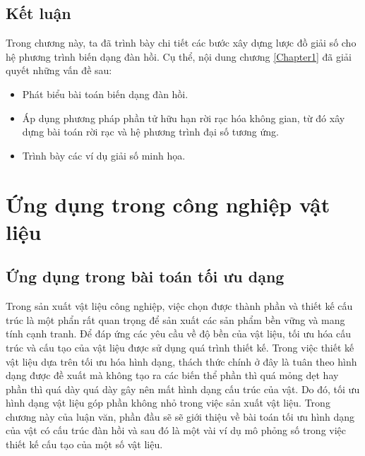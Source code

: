 \documentclass[
12pt, %
oneside, %
english, %
onehalfspacing, %
nolistspacing, %
headsepline, %
addchap,
]{MastersDoctoralThesis} %
\renewcommand{\baselinestretch}{1.5}
\begin{document}
\section{Kết luận}
Trong chương này, ta đã trình bày chi tiết các bước xây dựng lược đồ giải số cho hệ phương trình biến dạng đàn hồi. Cụ thể, nội dung chương \ref{Chapter1} đã giải quyết những vấn đề sau:
\begin{itemize}
\item Phát biểu bài toán biến dạng đàn hồi.
\item Áp dụng phương pháp phần tử hữu hạn rời rạc hóa không gian, từ đó xây dựng bài toán rời rạc và hệ phương trình đại số tương ứng.
\item Trình bày các ví dụ giải số minh họa.
\end{itemize}

\chapter{Ứng dụng trong công nghiệp vật liệu}\label{Chapter2}
\renewcommand{\baselinestretch}{1.25}
\minitoc
\renewcommand{\baselinestretch}{1.5}
\section{Ứng dụng trong bài toán tối ưu dạng}
Trong sản xuất vật liệu công nghiệp, việc chọn được thành phần và thiết kế cấu trúc là một phẩn rất quan trọng để sản xuất các sản phẩm bền vững và mang tính cạnh tranh. Để đáp ứng các yêu cầu về độ bền của vật liệu, tối ưu hóa cấu trúc và cấu tạo của vật liệu được sử dụng quá trình thiết kế. Trong việc thiết kế vật liệu dựa trên tối ưu hóa hình dạng, thách thức chính ở đây là tuân theo hình dạng được đề xuất mà không tạo ra các biến thể phần thì quá mỏng dẹt hay phần thì quá dày quá dày gây nên mất hình dạng cấu trúc của vật. Do đó, tối ưu hình dạng vật liệu góp phần không nhỏ trong việc sản xuất vật liệu. Trong chương này của luận văn, phần đầu sẽ sẽ giới thiệu về bài toán tối ưu hình dạng của vật có cấu trúc đàn hồi và sau đó là một vài ví dụ mô phỏng số trong việc thiết kế cấu tạo của một số vật liệu.
\end{document}
